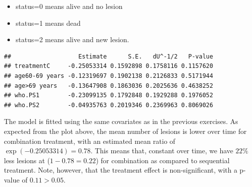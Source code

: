 \documentclass[
  11pt,
]{article}
\newenvironment{Shaded}{\begin{snugshade}}{\end{snugshade}}
\newcommand{\AttributeTok}[1]{\textcolor[rgb]{0.77,0.63,0.00}{#1}}
\newcommand{\CommentTok}[1]{\textcolor[rgb]{0.56,0.35,0.01}{\textit{#1}}}
\newcommand{\DecValTok}[1]{\textcolor[rgb]{0.00,0.00,0.81}{#1}}
\newcommand{\ErrorTok}[1]{\textcolor[rgb]{0.64,0.00,0.00}{\textbf{#1}}}
\newcommand{\FunctionTok}[1]{\textcolor[rgb]{0.00,0.00,0.00}{#1}}
\newcommand{\NormalTok}[1]{#1}
\newcommand{\OtherTok}[1]{\textcolor[rgb]{0.56,0.35,0.01}{#1}}
\newcommand{\SpecialCharTok}[1]{\textcolor[rgb]{0.00,0.00,0.00}{#1}}
\providecommand{\tightlist}{%
  \setlength{\itemsep}{0pt}\setlength{\parskip}{0pt}}
\begin{document}
\begin{itemize}
\tightlist
\item
  status=0 means alive and no lesion
\item
  status=1 means dead
\item
  status=2 means alive and new lesion.
\end{itemize}

\begin{Shaded}
\end{Shaded}

\begin{verbatim}
##                   Estimate      S.E.   dU^-1/2   P-value
## treatmentC     -0.25053314 0.1592898 0.1758116 0.1157620
## age60-69 years -0.12319697 0.1902138 0.2126833 0.5171944
## age>69 years   -0.13647908 0.1863036 0.2025636 0.4638252
## who.PS1        -0.23099135 0.1792848 0.1929288 0.1976052
## who.PS2        -0.04935763 0.2019346 0.2369963 0.8069026
\end{verbatim}

The model is fitted using the same covariates as in the previous
exercises. As expected from the plot above, the mean number of lesions
is lower over time for combination treatment, with an estimated mean
ratio of \(\exp(-0.25053314)=0.78\). This means that, constant over
time, we have \(22\%\) less lesions at (\(1-0.78=0.22\)) for combination
as compared to sequential treatment. Note, however, that the treatment
effect is non-significant, with a p-value of \(0.11 > 0.05\).
\end{document}
